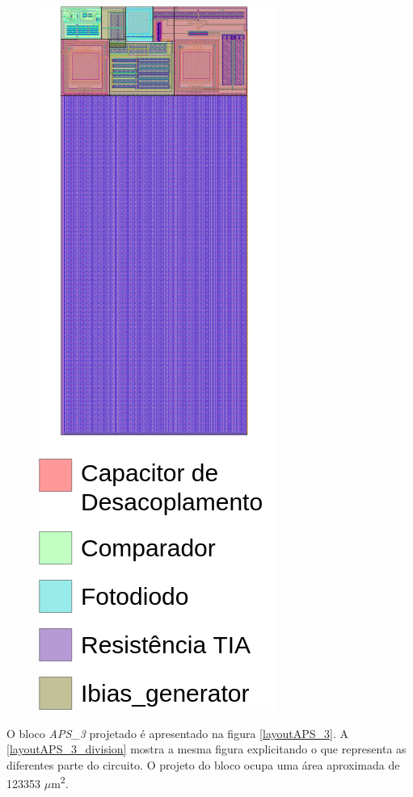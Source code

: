 \begin{figure}[!h]
\begin{minipage}{0.4\textwidth}
    \includegraphics[scale=0.4]{Projeto/Layout/Imagens/Image_TIA.png}
    \label{layoutTIA_division}
    \end{minipage}
\end{figure}

O bloco \textit{APS\_3} projetado é apresentado na figura \autoref{layoutAPS_3}. A \autoref{layoutAPS_3_division} mostra a mesma figura explicitando o que representa as diferentes parte do circuito. O projeto do bloco ocupa uma área aproximada de 123353 $\mu$m\textsuperscript{2}.

